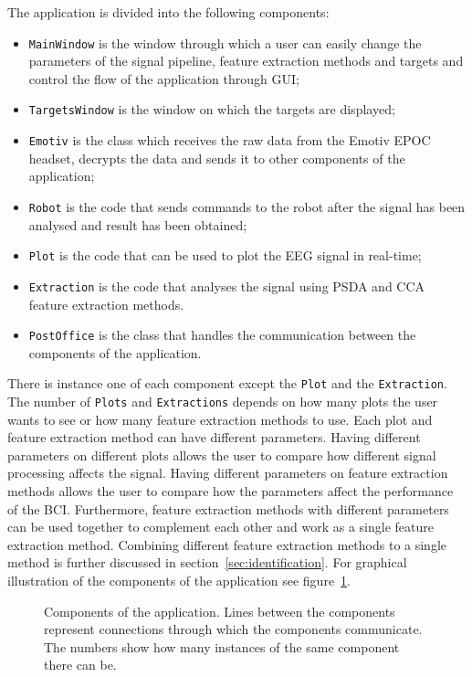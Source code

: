 The application is divided into the following components:
\begin{itemize}
	\item\texttt{MainWindow} is the window through which a user can easily change the parameters of the signal pipeline, \gls{feature extraction} methods and \glspl{target} and control the flow of the application through \gls{GUI};
	\item\texttt{TargetsWindow} is the window on which the \glspl{target} are displayed;
	\item\texttt{Emotiv} is the class which receives the raw data from the Emotiv EPOC headset, decrypts the data and sends it to other components of the application;
	\item\texttt{Robot} is the code that sends commands to the robot after the signal has been analysed and result has been obtained;
	\item\texttt{Plot} is the code that can be used to plot the \gls{EEG} signal in real-time;
	\item\texttt{Extraction} is the code that analyses the signal using \gls{PSDA} and \gls{CCA} \gls{feature extraction} methods.
	\item\texttt{PostOffice} is the class that handles the communication between the components of the application.
\end{itemize}
There is instance one of each component except the \texttt{Plot} and the \texttt{Extraction}. The number of \texttt{Plots} and \texttt{Extractions} depends on how many plots the user wants to see or how many \gls{feature extraction} methods to use. Each plot and \gls{feature extraction} method can have different parameters. Having different parameters on different plots allows the user to compare how different signal processing affects the signal. Having different parameters on \gls{feature extraction} methods allows the user to compare how the parameters affect the performance of the \gls{BCI}. Furthermore, \gls{feature extraction} methods with different parameters can be used together to complement each other and work as a single \gls{feature extraction} method. Combining different \gls{feature extraction} methods to a single method is further discussed in section~\ref{sec:identification}. For graphical illustration of the components of the application see figure~\ref{fig:class_diagram}.

\begin{figure}[h!]
	\centering
	
	\caption{Components of the application. Lines between the components represent connections through which the components communicate. The numbers show how many instances of the same component there can be.}
	\label{fig:class_diagram}
\end{figure}

